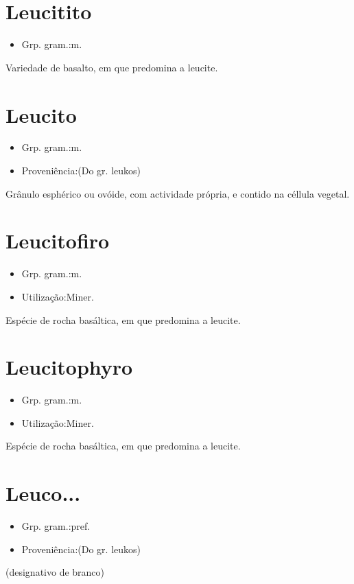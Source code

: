 \section{Leucitito}
\begin{itemize}
\item {Grp. gram.:m.}
\end{itemize}
Variedade de basalto, em que predomina a leucite.
\section{Leucito}
\begin{itemize}
\item {Grp. gram.:m.}
\end{itemize}
\begin{itemize}
\item {Proveniência:(Do gr. \textunderscore leukos\textunderscore )}
\end{itemize}
Grânulo esphérico ou ovóide, com actividade própria, e contido na céllula vegetal.
\section{Leucitofiro}
\begin{itemize}
\item {Grp. gram.:m.}
\end{itemize}
\begin{itemize}
\item {Utilização:Miner.}
\end{itemize}
Espécie de rocha basáltica, em que predomina a leucite.
\section{Leucitophyro}
\begin{itemize}
\item {Grp. gram.:m.}
\end{itemize}
\begin{itemize}
\item {Utilização:Miner.}
\end{itemize}
Espécie de rocha basáltica, em que predomina a leucite.
\section{Leuco...}
\begin{itemize}
\item {Grp. gram.:pref.}
\end{itemize}
\begin{itemize}
\item {Proveniência:(Do gr. \textunderscore leukos\textunderscore )}
\end{itemize}
(designativo de \textunderscore branco\textunderscore )
